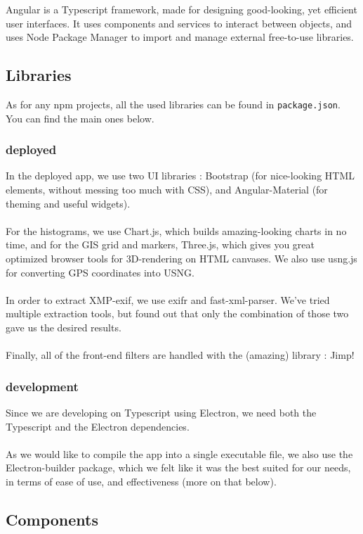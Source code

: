 \documentclass[12pt,a4paper]{article}
\begin{document}
Angular is a Typescript framework, made for designing good-looking, yet efficient user interfaces. It uses components and services to interact between objects, and uses Node Package Manager to import and manage external free-to-use libraries.

\subsection{Libraries}

As for any npm projects, all the used libraries can be found in \texttt{package.json}. You can find the main ones below.

\subsubsection{deployed}

In the deployed app, we use two UI libraries : Bootstrap (for nice-looking HTML elements, without messing too much with CSS), and Angular-Material (for theming and useful widgets).\\
~\\
For the histograms, we use Chart.js, which builds amazing-looking charts in no time, and for the GIS grid and markers, Three.js, which gives you great optimized browser tools for 3D-rendering on HTML canvases. We also use usng.js for converting GPS coordinates into USNG.\\
~\\
In order to extract XMP-exif, we use exifr and fast-xml-parser. We've tried multiple extraction tools, but found out that only the combination of those two gave us the desired results.\\
~\\
Finally, all of the front-end filters are handled with the (amazing) library : Jimp!

\subsubsection{development}
Since we are developing on Typescript using Electron, we need both the Typescript and the Electron dependencies.\\
~\\
As we would like to compile the app into a single executable file, we also use the Electron-builder package, which we felt like it was the best suited for our needs, in terms of ease of use, and effectiveness (more on that below).

\subsection{Components}
\end{document}
